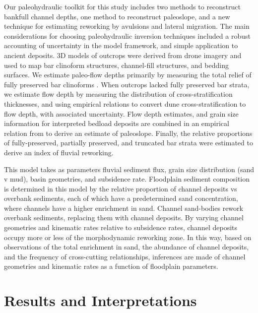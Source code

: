 \documentclass[draft]{compact_proposal}
\begin{document}
Our paleohydraulic toolkit for this study includes two methods to reconstruct bankfull channel depths, one method to reconstruct paleoslope, and a new technique for estimating reworking by avulsions and lateral migration.
The main considerations for choosing paleohydraulic inversion techniques included a robust accounting of uncertainty in the model framework, and simple application to ancient deposits.
3D models of outcrops were derived from drone imagery and used to map bar clinoform structures, channel-fill structures, and bedding surfaces.
We estimate paleo-flow depths primarily by measuring the total relief of fully preserved bar clinoforms .
When outcrops lacked fully preserved bar strata, we estimate flow depth by measuring the distribution of cross-stratification thicknesses, and using empirical relations to convert dune cross-stratification to flow depth, with associated uncertainty.
Flow depth estimates, and grain size information for interpreted bedload deposits are combined in an empirical relation from \cnote[trampush] to derive an estimate of paleoslope.
Finally, the relative proportions of fully-preserved, partially preserved, and truncated bar strata were estimated to derive an index of fluvial reworking.

This model takes as parameters fluvial sediment flux, grain size distribution (sand v mud), basin geometries, and subsidence rate.
Floodplain sediment composition is determined in this model by the relative proportion of channel deposits vs overbank sediments, each of which have a predetermined sand concentration, where channels have a higher enrichment in sand.
Channel sand-bodies rework overbank sediments, replacing them with channel deposits.
By varying channel geometries and kinematic rates relative to subsidence rates, channel deposits occupy more or less of the morphodynamic reworking zone.
In this way, based on observations of the total enrichment in sand, the abundance of channel deposits, and the frequency of cross-cutting relationships, inferences are made of channel geometries and kinematic rates as a function of floodplain parameters.

\section{Results and Interpretations}
\end{document}
